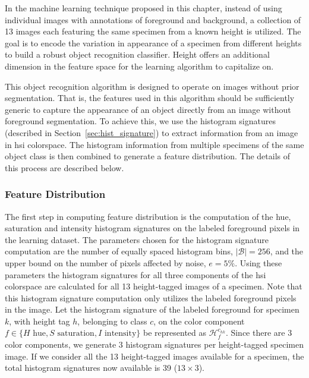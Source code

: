 In the machine learning technique proposed in this chapter, instead of using individual images with annotations of foreground and background, a collection of 13 images each featuring the same specimen from a known height is utilized. The goal is to encode the variation in appearance of a specimen from different heights to build a robust object recognition classifier. Height offers an additional dimension in the feature space for the learning algorithm to capitalize on.

This object recognition algorithm is designed to operate on images without prior segmentation. That is, the features used in this algorithm should be sufficiently generic to capture the appearance of an object directly from an image without foreground segmentation. To achieve this, we use the histogram signatures (described in Section~\ref{sec:hist_signature}) to extract information from an image in \gls{hsi} colorspace. The histogram information from multiple specimens of the same object class is then combined to generate a feature distribution. The details of this process are described below.

\subsubsection{Feature Distribution}
\label{sec:distdes_feature_distr}

The first step in computing feature distribution is the computation of the hue, saturation and intensity histogram signatures on the labeled foreground pixels in the learning dataset. The parameters chosen for the histogram signature computation are the number of equally spaced histogram bins, $|\mathcal{B}|=256$, and the upper bound on the number of pixels affected by noise, $e=5\%$. Using these parameters the histogram signatures for all three components of the \gls{hsi} colorspace are calculated for all 13 height-tagged images of a specimen. Note that this histogram signature computation only utilizes the labeled foreground pixels in the image. Let the histogram signature of the labeled foreground for specimen $k$, with height tag $h$, belonging to class $c$, on the color component $f\in\{H \text{ hue}, S \text{ saturation}, I \text{ intensity}\}$ be represented as $\mathcal{H}^{c_{hk}}_f$. Since there are 3 color components, we generate 3 histogram signatures per height-tagged specimen image. If we 
consider all the 13 height-tagged images available for a specimen, the total histogram signatures now available is 39 ($13 \times 3$).

